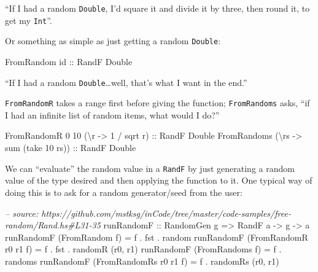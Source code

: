 \documentclass[]{article}
\newenvironment{Shaded}{}{}
\newcommand{\DataTypeTok}[1]{\textcolor[rgb]{0.56,0.13,0.00}{{#1}}}
\newcommand{\DecValTok}[1]{\textcolor[rgb]{0.25,0.63,0.44}{{#1}}}
\newcommand{\CommentTok}[1]{\textcolor[rgb]{0.38,0.63,0.69}{\textit{{#1}}}}
\newcommand{\OtherTok}[1]{\textcolor[rgb]{0.00,0.44,0.13}{{#1}}}
\newcommand{\FunctionTok}[1]{\textcolor[rgb]{0.02,0.16,0.49}{{#1}}}
\newcommand{\NormalTok}[1]{{#1}}
\begin{document}
``If I had a random \texttt{Double}, I'd square it and divide it by three, then
round it, to get my \texttt{Int}''.

Or something as simple as just getting a random \texttt{Double}:

\begin{Shaded}
\begin{Highlighting}[]
\DataTypeTok{FromRandom}\OtherTok{ id ::} \DataTypeTok{RandF} \DataTypeTok{Double}
\end{Highlighting}
\end{Shaded}

``If I had a random \texttt{Double}\ldots{}well, that's what I want in the
end.''

\texttt{FromRandomR} takes a range first before giving the function;
\texttt{FromRandoms} asks, ``if I had an infinite list of random items, what
would I do?''

\begin{Shaded}
\begin{Highlighting}[]
\DataTypeTok{FromRandomR} \DecValTok{0} \DecValTok{10} \NormalTok{(\textbackslash{}r }\OtherTok{->} \DecValTok{1} \FunctionTok{/} \NormalTok{sqrt r)}\OtherTok{ ::} \DataTypeTok{RandF} \DataTypeTok{Double}
\DataTypeTok{FromRandoms} \NormalTok{(\textbackslash{}rs }\OtherTok{->} \NormalTok{sum (take }\DecValTok{10} \NormalTok{rs))}\OtherTok{ ::} \DataTypeTok{RandF} \DataTypeTok{Double}
\end{Highlighting}
\end{Shaded}

We can ``evaluate'' the random value in a \texttt{RandF} by just generating a
random value of the type desired and then applying the function to it. One
typical way of doing this is to ask for a random generator/seed from the user:

\begin{Shaded}
\begin{Highlighting}[]
\CommentTok{-- source: https://github.com/mstksg/inCode/tree/master/code-samples/free-random/Rand.hs#L31-35}
\OtherTok{runRandomF ::} \DataTypeTok{RandomGen} \NormalTok{g }\OtherTok{=>} \DataTypeTok{RandF} \NormalTok{a }\OtherTok{->} \NormalTok{g }\OtherTok{->} \NormalTok{a}
\NormalTok{runRandomF (}\DataTypeTok{FromRandom} \NormalTok{f)         }\FunctionTok{=} \NormalTok{f }\FunctionTok{.} \NormalTok{fst }\FunctionTok{.} \NormalTok{random}
\NormalTok{runRandomF (}\DataTypeTok{FromRandomR} \NormalTok{r0 r1 f)  }\FunctionTok{=} \NormalTok{f }\FunctionTok{.} \NormalTok{fst }\FunctionTok{.} \NormalTok{randomR (r0, r1)}
\NormalTok{runRandomF (}\DataTypeTok{FromRandoms} \NormalTok{f)        }\FunctionTok{=} \NormalTok{f }\FunctionTok{.} \NormalTok{randoms}
\NormalTok{runRandomF (}\DataTypeTok{FromRandomRs} \NormalTok{r0 r1 f) }\FunctionTok{=} \NormalTok{f }\FunctionTok{.} \NormalTok{randomRs (r0, r1)}
\end{Highlighting}
\end{Shaded}
\end{document}
